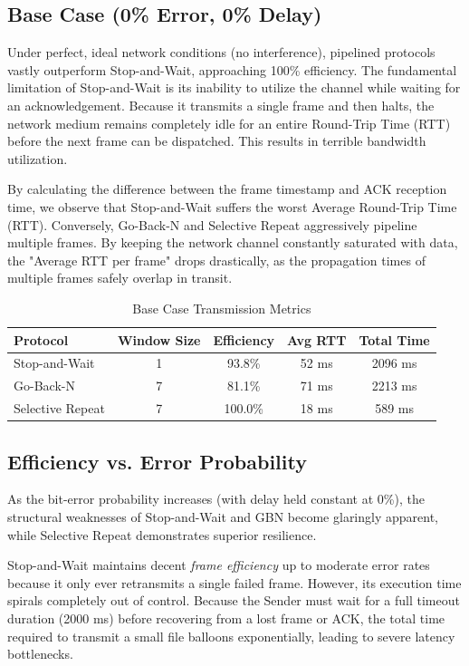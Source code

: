 \documentclass[12pt]{article}
\begin{document}
\subsection{Base Case (0\% Error, 0\% Delay)}
Under perfect, ideal network conditions (no interference), pipelined protocols vastly outperform Stop-and-Wait, approaching 100\% efficiency. The fundamental limitation of Stop-and-Wait is its inability to utilize the channel while waiting for an acknowledgement. Because it transmits a single frame and then halts, the network medium remains completely idle for an entire Round-Trip Time (RTT) before the next frame can be dispatched. This results in terrible bandwidth utilization. 

By calculating the difference between the frame timestamp and ACK reception time, we observe that Stop-and-Wait suffers the worst Average Round-Trip Time (RTT). Conversely, Go-Back-N and Selective Repeat aggressively pipeline multiple frames. By keeping the network channel constantly saturated with data, the "Average RTT per frame" drops drastically, as the propagation times of multiple frames safely overlap in transit.

\begin{table}[H]
\centering
\begin{tabular}{@{}lcccc@{}}
\toprule
\textbf{Protocol} & \textbf{Window Size} & \textbf{Efficiency} & \textbf{Avg RTT} & \textbf{Total Time} \\ \midrule
Stop-and-Wait     & 1                  & 93.8\%              & 52 ms             & 2096 ms              \\
Go-Back-N         & 7                  & 81.1\%             & 71 ms             & 2213 ms              \\
Selective Repeat  & 7                  & 100.0\%             & 18 ms             & 589 ms              \\ \bottomrule
\end{tabular}
\caption{Base Case Transmission Metrics}
\end{table}

\subsection{Efficiency vs. Error Probability}
As the bit-error probability increases (with delay held constant at 0\%), the structural weaknesses of Stop-and-Wait and GBN become glaringly apparent, while Selective Repeat demonstrates superior resilience.

Stop-and-Wait maintains decent \textit{frame efficiency} up to moderate error rates because it only ever retransmits a single failed frame. However, its execution time spirals completely out of control. Because the Sender must wait for a full timeout duration (2000 ms) before recovering from a lost frame or ACK, the total time required to transmit a small file balloons exponentially, leading to severe latency bottlenecks.
\end{document}
